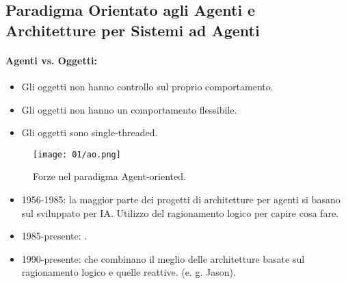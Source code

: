 \subsection{Paradigma Orientato agli Agenti e Architetture per Sistemi ad Agenti}

\paragraph{Agenti vs. Oggetti:}

\begin{itemize}
  \item Gli oggetti non hanno controllo sul proprio comportamento. 
  \item Gli oggetti non hanno un comportamento flessibile. 
  \item Gli oggetti sono single-threaded.
\end{itemize}

\begin{figure}[h]
  \centering
  \texttt{[image: 01/ao.png]}
  \caption{Forze nel paradigma Agent-oriented.}
\end{figure}


\begin{itemize}
  \item 1956-1985: la maggior parte dei progetti di architetture per agenti si basano sul  sviluppato per IA. Utilizzo del ragionamento logico per capire cosa fare. 
  \item 1985-presente: . 
  \item 1990-presente:  che combinano il meglio delle architetture basate sul ragionamento logico e quelle reattive. (e. g. Jason).
\end{itemize}


